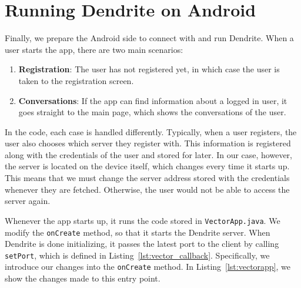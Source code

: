 \section{Running Dendrite on Android}
Finally, we prepare the Android side to connect with and run Dendrite.
When a user starts the app, there are two main scenarios:
\begin{enumerate}
	\item{
	      \textbf{Registration}:
	      The user has not registered yet, in which case the user is taken to the registration screen.
	      }
	\item{
	      \textbf{Conversations}:
	      If the app can find information about a logged in user, it goes straight to the main page, which shows the conversations of the user.
	      }
\end{enumerate}
In the code, each case is handled differently.
Typically, when a user registers, the user also chooses which server they register with.
This information is registered along with the credentials of the user and stored for later.
In our case, however, the server is located on the device itself, which changes every time it starts up.
This means that we must change the server address stored with the credentials whenever they are fetched.
Otherwise, the user would not be able to access the server again.

Whenever the app starts up, it runs the code stored in \texttt{VectorApp.java}.
We modify the \texttt{onCreate} method, so that it starts the Dendrite server.
When Dendrite is done initializing, it passes the latest port to the client by calling \texttt{setPort}, which is defined in Listing~\ref{lst:vector_callback}.
Specifically, we introduce our changes into the \texttt{onCreate} method.
In Listing~\ref{lst:vectorapp}, we show the changes made to this entry point.

